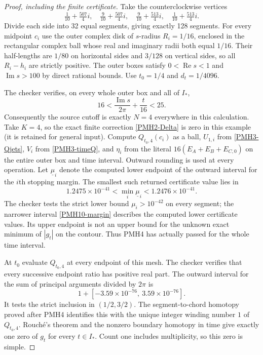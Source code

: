 \documentclass[11pt]{article}
\newcommand{\Rea}{\operatorname{Re}}
\newcommand{\Ima}{\operatorname{Im}}
\begin{document}
\begin{proof}[Proof, including the finite certificate]
Take the counterclockwise vertices
\[
 \tfrac1{10}+\tfrac{507}{4}i,\quad
 \tfrac9{10}+\tfrac{507}{4}i,\quad
 \tfrac9{10}+\tfrac{513}{4}i,\quad
 \tfrac1{10}+\tfrac{513}{4}i.
\]
Divide each side into 32 equal segments, giving exactly 128
segments. For every midpoint $c_i$ use the outer complex disk of
$s$-radius $R_i=1/16$, enclosed in the rectangular complex ball
whose real and imaginary radii both equal $1/16$. Their half-lengths
are $1/80$ on horizontal sides and $3/128$ on vertical sides, so
all $R_i-h_i$ are strictly positive. The outer boxes satisfy
$0<\Rea s<1$ and $\Ima s>100$ by direct rational bounds.
Use $t_0=1/4$ and $d_t=1/4096$.

The checker verifies, on every whole outer box and all of $I_*$,
\[
 16<\frac{\Ima s}{2\pi}+\frac t{16}<25.
\]
Consequently the source cutoff is exactly $N=4$ everywhere in this
calculation. Take $K=4$, so the exact finite correction
\eqref{PMH2-Delta} is zero in this example (it is retained for
general input). Compute $Q_{t_0,4}(c_i)$ as a ball, $U_{1,i}$ from
\eqref{PMH3-Qjets}, $V_i$ from \eqref{PMH3-timeQ}, and $\eta_i$
from the literal $16(E_A+E_B+E_{C,0})$ on the entire outer box and
time interval. Outward rounding is used at every operation.
Let $\underline\mu_i$ denote the computed lower endpoint of the
outward interval for the $i$th stopping margin. The smallest such
returned certificate value lies in
\begin{equation}\label{PMH10-margin}
 1.2475\times10^{-41}<\min_i\underline\mu_i<1.2476\times10^{-41}.
\end{equation}
The checker tests the strict lower bound $\mu_i>10^{-42}$ on every
segment; the narrower interval \eqref{PMH10-margin} describes the
computed lower certificate values. Its upper endpoint is not an
upper bound for the unknown exact minimum of $|g_t|$ on the contour.
Thus PMH4 has actually passed for the whole time interval.

At $t_0$ evaluate $Q_{t_0,4}$ at every endpoint of this mesh.
The checker verifies that every successive endpoint ratio has
positive real part. The outward interval for the sum of principal
arguments divided by $2\pi$ is
\[
 1+[-3.59\times10^{-76},\ 3.59\times10^{-76}].
\]
It tests the strict inclusion in $(1/2,3/2)$. The segment-to-chord
homotopy proved after PMH4 identifies this with the unique integer
winding number $1$ of $Q_{t_0,4}$. Rouch\'e's theorem and the
nonzero boundary homotopy in time give exactly one zero of $g_t$
for every $t\in I_*$. Count one includes multiplicity, so this zero
is simple.


\end{proof}
\end{document}
